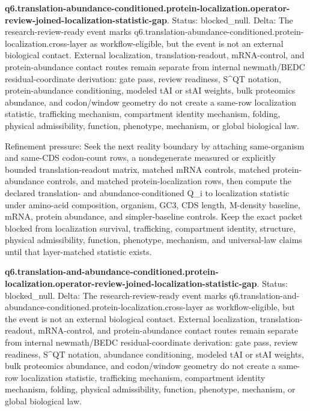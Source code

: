 \textbf{q6.translation-abundance-conditioned.protein-localization.operator-review-joined-localization-statistic-gap}. Status: blocked\_null. Delta: The research-review-ready event marks q6.translation-abundance-conditioned.protein-localization.cross-layer as workflow-eligible, but the event is not an external biological contact. External localization, translation-readout, mRNA-control, and protein-abundance contact routes remain separate from internal newmath/BEDC residual-coordinate derivation: gate pass, review readiness, S\textasciicircum{}QT notation, protein-abundance conditioning, modeled tAI or stAI weights, bulk proteomics abundance, and codon/window geometry do not create a same-row localization statistic, trafficking mechanism, compartment identity mechanism, folding, physical admissibility, function, phenotype, mechanism, or global biological law.

Refinement pressure: Seek the next reality boundary by attaching same-organism and same-CDS codon-count rows, a nondegenerate measured or explicitly bounded translation-readout matrix, matched mRNA controls, matched protein-abundance controls, and matched protein-localization rows, then compute the declared translation- and abundance-conditioned Q\_i to localization statistic under amino-acid composition, organism, GC3, CDS length, M-density baseline, mRNA, protein abundance, and simpler-baseline controls. Keep the exact packet blocked from localization survival, trafficking, compartment identity, structure, physical admissibility, function, phenotype, mechanism, and universal-law claims until that layer-matched statistic exists.

\textbf{q6.translation-and-abundance-conditioned.protein-localization.operator-review-joined-localization-statistic-gap}. Status: blocked\_null. Delta: The research-review-ready event marks q6.translation-and-abundance-conditioned.protein-localization.cross-layer as workflow-eligible, but the event is not an external biological contact. External localization, translation-readout, mRNA-control, and protein-abundance contact routes remain separate from internal newmath/BEDC residual-coordinate derivation: gate pass, review readiness, S\textasciicircum{}QT notation, abundance conditioning, modeled tAI or stAI weights, bulk proteomics abundance, and codon/window geometry do not create a same-row localization statistic, trafficking mechanism, compartment identity mechanism, folding, physical admissibility, function, phenotype, mechanism, or global biological law.

